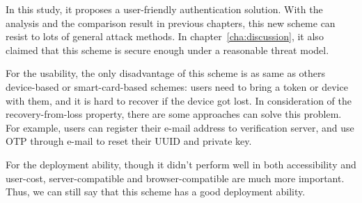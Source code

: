 \begin{CJK}{Bg5}{bsmi}
In this study, it proposes a user-friendly authentication solution. With the analysis and the comparison result in previous chapters, this new scheme can resist to lots of general attack methods. In chapter~\ref{cha:discussion}, it also claimed that this scheme is secure enough under a reasonable threat model. 

For the usability, the only disadvantage of this scheme is as same as others device-based or smart-card-based schemes: users need to bring a token or device with them, and it is hard to recover if the device got lost. In consideration of the recovery-from-loss property, there are some approaches can solve this problem. For example, users can register their e-mail address to verification server, and use OTP through e-mail to reset their UUID and private key.

For the deployment ability, though it didn't perform well in both accessibility and user-cost, server-compatible and browser-compatible are much more important. Thus, we can still say that this scheme has a good deployment ability.

\end{CJK}